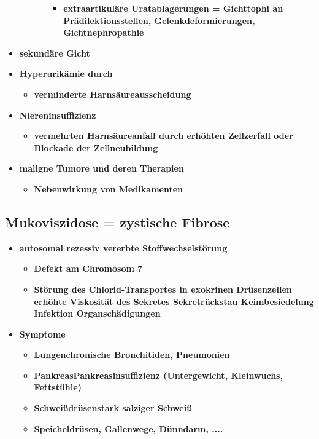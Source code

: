 \begin{itemize}
\begin{itemize}
\begin{itemize}
							\begin{itemize}
								\item \textbf{extraartikuläre Uratablagerungen = Gichttophi an Prädilektionsstellen, Gelenkdeformierungen, Gichtnephropathie}
							\end{itemize}
					\end{itemize}								
			\end{itemize}
		\item \textbf{sekundäre Gicht}
		\item \textbf{Hyperurikämie durch}
			\begin{itemize}
				\item \textbf{verminderte Harnsäureausscheidung}
			\end{itemize}
		\item \textbf{Niereninsuffizienz}
			\begin{itemize}
				\item \textbf{vermehrten Harnsäureanfall durch erhöhten Zellzerfall oder Blockade der Zellneubildung}
			\end{itemize}
		\item \textbf{maligne Tumore und deren Therapien}
			\begin{itemize}
				\item \textbf{Nebenwirkung von Medikamenten}
			\end{itemize}
	\end{itemize}
\subsection{Mukoviszidose = zystische Fibrose}
	\begin{itemize}
		\item \textbf{autosomal rezessiv vererbte Stoffwechselstörung}
			\begin{itemize}
				\item \textbf{Defekt am Chromosom 7}
				\item \textbf{Störung des Chlorid-Transportes in exokrinen Drüsenzellen erhöhte Viskosität des Sekretes    Sekretrückstau  Keimbesiedelung   Infektion   Organschädigungen}
			\end{itemize}
		\item \textbf{Symptome}
			\begin{itemize}
				\item \textbf{Lungenchronische Bronchitiden, Pneumonien}
				\item \textbf{PankreasPankreasinsuffizienz (Untergewicht, Kleinwuchs, Fettstühle)}
				\item \textbf{Schweißdrüsenstark salziger Schweiß}
				\item \textbf{Speicheldrüsen, Gallenwege, Dünndarm, ....}
			\end{itemize}
	\end{itemize}

